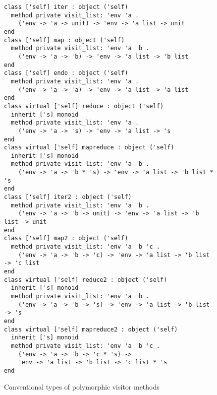 \begin{figure}[p]
\begin{mdframed}[backgroundcolor=green!10]
\begin{lstlisting}
class ['self] iter : object ('self)
  method private visit_list: 'env 'a .
    ('env -> 'a -> unit) -> 'env -> 'a list -> unit
end
class ['self] map : object ('self)
  method private visit_list: 'env 'a 'b .
    ('env -> 'a -> 'b) -> 'env -> 'a list -> 'b list
end
class ['self] endo : object ('self)
  method private visit_list: 'env 'a .
    ('env -> 'a -> 'a) -> 'env -> 'a list -> 'a list
end
class virtual ['self] reduce : object ('self)
  inherit ['s] monoid
  method private visit_list: 'env 'a .
    ('env -> 'a -> 's) -> 'env -> 'a list -> 's
end
class virtual ['self] mapreduce : object ('self)
  inherit ['s] monoid
  method private visit_list: 'env 'a 'b .
    ('env -> 'a -> 'b * 's) -> 'env -> 'a list -> 'b list * 's
end
class ['self] iter2 : object ('self)
  method private visit_list: 'env 'a 'b .
    ('env -> 'a -> 'b -> unit) -> 'env -> 'a list -> 'b list -> unit
end
class ['self] map2 : object ('self)
  method private visit_list: 'env 'a 'b 'c .
    ('env -> 'a -> 'b -> 'c) -> 'env -> 'a list -> 'b list -> 'c list
end
class virtual ['self] reduce2 : object ('self)
  inherit ['s] monoid
  method private visit_list: 'env 'a 'b .
    ('env -> 'a -> 'b -> 's) -> 'env -> 'a list -> 'b list -> 's
end
class virtual ['self] mapreduce2 : object ('self)
  inherit ['s] monoid
  method private visit_list: 'env 'a 'b 'c .
    ('env -> 'a -> 'b -> 'c * 's) ->
    'env -> 'a list -> 'b list -> 'c list * 's
end
\end{lstlisting}
\end{mdframed}
\caption{Conventional types of polymorphic visitor methods}
\label{fig:convention}
\end{figure}
